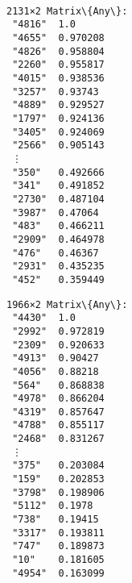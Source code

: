 \documentclass[11pt]{article}
\begin{document}
    \begin{center}
    \end{center}
    { \hspace*{\fill} \\}
    
    \begin{Verbatim}[commandchars=\\\{\}]

    \end{Verbatim}

    \begin{center}
    \end{center}
    { \hspace*{\fill} \\}
    
    \begin{center}
    \end{center}
    { \hspace*{\fill} \\}
    
    \begin{Verbatim}[commandchars=\\\{\}]

    \end{Verbatim}

    
    \begin{Verbatim}[commandchars=\\\{\}]
2131×2 Matrix\{Any\}:
 "4816"  1.0
 "4655"  0.970208
 "4826"  0.958804
 "2260"  0.955817
 "4015"  0.938536
 "3257"  0.93743
 "4889"  0.929527
 "1797"  0.924136
 "3405"  0.924069
 "2566"  0.905143
 ⋮       
 "350"   0.492666
 "341"   0.491852
 "2730"  0.487104
 "3987"  0.47064
 "483"   0.466211
 "2909"  0.464978
 "476"   0.46367
 "2931"  0.435235
 "452"   0.359449
    \end{Verbatim}

    
    
    \begin{Verbatim}[commandchars=\\\{\}]
1966×2 Matrix\{Any\}:
 "4430"  1.0
 "2992"  0.972819
 "2309"  0.920633
 "4913"  0.90427
 "4056"  0.88218
 "564"   0.868838
 "4978"  0.866204
 "4319"  0.857647
 "4788"  0.855117
 "2468"  0.831267
 ⋮       
 "375"   0.203084
 "159"   0.202853
 "3798"  0.198906
 "5112"  0.1978
 "738"   0.19415
 "3317"  0.193811
 "747"   0.189873
 "10"    0.181605
 "4954"  0.163099
    \end{Verbatim}
\end{document}
